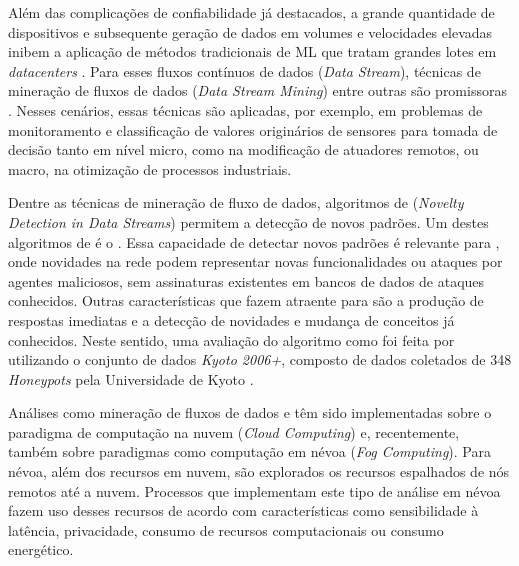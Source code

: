 Além das complicações de confiabilidade já destacados, a grande quantidade de
dispositivos e subsequente geração de dados em volumes e velocidades elevadas
inibem a aplicação de métodos tradicionais de ML que tratam grandes lotes em
\emph{datacenters} \cite{Lopez2019}.
Para esses fluxos contínuos de dados (\emph{Data Stream}), técnicas de
mineração de fluxos de dados (\emph{Data Stream Mining}) entre outras são
promissoras \cite{Faria2016ndds,Akbar2017,Lopez2019,AriyaluranHabeeb2019}.
% 
Nesses cenários, essas técnicas são aplicadas, por exemplo, em problemas de
monitoramento e classificação de valores originários de sensores para tomada de
decisão tanto em nível micro, como na modificação de atuadores remotos, ou
macro, na otimização de processos industriais.
% 



Dentre as técnicas de mineração de fluxo de dados, algoritmos de \nd
(\emph{Novelty Detection in Data Streams}) permitem a detecção de novos padrões.
Um destes algoritmos de \nd é o \minas \cite{Faria2013Minas}.
Essa capacidade de detectar novos padrões é relevante para \nids, onde novidades
na rede podem representar novas funcionalidades ou ataques por agentes
maliciosos, sem assinaturas existentes em bancos de dados de ataques conhecidos.
Outras características que fazem \nd atraente para \nids são a produção de
respostas imediatas e a detecção de novidades e mudança de conceitos já
conhecidos.
Neste sentido, uma avaliação do algoritmo \minas como \nids foi feita por
 utilizando o conjunto de dados \emph{Kyoto 2006+},
composto de dados coletados de 348 \emph{Honeypots} pela Universidade de Kyoto
\cite{KyotoDataset}.

Análises como mineração de fluxos de dados e \nd têm sido implementadas sobre
o paradigma de computação na nuvem (\emph{Cloud Computing}) e, recentemente,
também sobre paradigmas como computação em névoa (\emph{Fog Computing}).
Para névoa, além dos recursos em nuvem, são explorados os recursos
espalhados de nós remotos até a nuvem.
Processos que implementam este tipo de análise em névoa fazem uso desses
recursos de acordo com características como sensibilidade à latência,
privacidade, consumo de recursos computacionais ou consumo energético.

